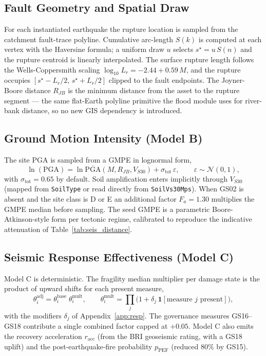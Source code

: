 \documentclass[11pt,a4paper]{article}
\begin{document}
\subsection{Fault Geometry and Spatial Draw}
For each instantiated earthquake the rupture location is sampled from the
catchment fault-trace polyline. Cumulative arc-length $S(k)$ is computed at each
vertex with the Haversine formula; a uniform draw $u$ selects $s^\star = u\,
S(n)$ and the rupture centroid is linearly interpolated. The surface rupture
length follows the Wells-Coppersmith scaling $\log_{10} L_r = -2.44 + 0.59\,M$,
and the rupture occupies $[s^\star - L_r/2,\, s^\star + L_r/2]$ clipped to the
fault endpoints. The Joyner-Boore distance $R_{JB}$ is the minimum distance from
the asset to the rupture segment --- the same flat-Earth polyline primitive the
flood module uses for river-bank distance, so no new GIS dependency is
introduced.

\subsection{Ground Motion Intensity (Model B)}
The site PGA is sampled from a GMPE in lognormal form,
\[
  \ln(\text{PGA}) = \ln\overline{\text{PGA}}(M, R_{JB}, V_{S30}) + \sigma_{\text{tot}}\,
  \varepsilon, \qquad \varepsilon \sim \mathcal{N}(0,1),
\]
with $\sigma_{\text{tot}} = 0.65$ by default. Soil amplification enters
implicitly through $V_{S30}$ (mapped from \texttt{SoilType} or read directly from
\texttt{SoilVs30Mps}). When GS02 is absent and the site class is D or E an
additional factor $F_a = 1.30$ multiplies the GMPE median before sampling. The
seed GMPE is a parametric Boore-Atkinson-style form per tectonic regime,
calibrated to reproduce the indicative attenuation of
Table~\ref{tab:seis_distance}.

\subsection{Seismic Response Effectiveness (Model C)}
Model C is deterministic. The fragility median multiplier per damage state is the
product of upward shifts for each present measure,
\[
  \theta^{\text{adj}}_{i} = \theta^{\text{base}}_{i}\; \theta^{\text{mult}}_{i},
  \qquad
  \theta^{\text{mult}}_{i} = \prod_{j} \bigl(1 + \delta_j\,
  \mathbf{1}[\text{measure } j \text{ present}]\bigr),
\]
with the modifiers $\delta_j$ of Appendix~\ref{app:resp}. The governance measures
GS16--GS18 contribute a single combined factor capped at $+0.05$. Model C also
emits the recovery acceleration $r_{\text{acc}}$ (from the BRI geoseismic rating,
with a GS18 uplift) and the post-earthquake-fire probability $p_{\text{PEF}}$
(reduced 80\% by GS15).
\end{document}
